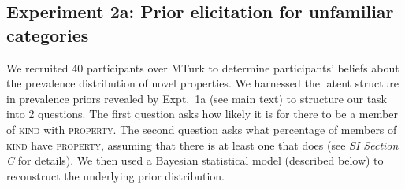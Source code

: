 \documentclass{pnastwo}
\begin{document}
\begin{article}
\begin{materials}
\subsection{Experiment 2a: Prior elicitation for unfamiliar categories}
We recruited 40 participants over MTurk to determine participants' beliefs about the prevalence distribution of novel properties.
We harnessed the latent structure in prevalence priors revealed by Expt.~1a (see main text) to structure our task into 2 questions.
The first question asks how likely it is for there to be a member of \textsc{kind} with \textsc{property}.
The second question asks what percentage of members of \textsc{kind} have \textsc{property}, assuming that there is at least one that does (see {\it SI Section C} for details).
We then used a Bayesian statistical model (described below) to reconstruct the underlying prior distribution. 

\end{materials}
\end{article}
\end{document}
